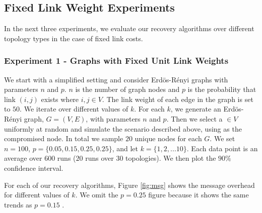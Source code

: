 \subsection{Fixed Link Weight Experiments}
\label{subsec:fixed}

In the next three experiments, we evaluate our recovery algorithms over different topology types in the case of fixed link costs.

\subsubsection{Experiment 1 - \er Graphs with Fixed Unit Link Weights}
\label{subsubsec:expt1}

We start with a simplified setting and consider 
Erd\"{o}s-R\'enyi graphs with parameters $n$ and $p$. 
$n$ is the number of graph nodes and $p$ is the probability that link $(i,j)$ exists where $i,j \in V$.
The link weight of each edge in the graph is set to $50$.
We iterate over different values of $k$. For each $k$, we 
generate an Erd\"{o}s-R\'enyi graph, $G = (V,E)$, with parameters $n$ and $p$. Then we select a \bad $\in V$ uniformly at random and simulate the scenario described above, 
using \bad as the compromised node. In total we sample $20$ unique nodes for each $G$.
We set $n=100$, $p=\{0.05,0.15,0.25, 0.25\}$, and let $k=\{1,2,
... 10\}$. Each data point is an average over $600$ runs ($20$ runs over 
$30$ topologies).  We then plot the $90 \%$ confidence interval.

For each of our recovery algorithms, Figure \ref{fig:msg} shows the
message overhead for different values of $k$. %
We omit the $p=0.25$ figure because it shows the same trends as $p=0.15$ \cite{Tech}. 

\begin{figure*}[t]
\centering
{}
\caption{Message overhead for \er Graphs with Fixed Unit Link Weights generated over different $p$ values. Note that the y-axis have different scales.}
\label{fig:msg}
\end{figure*}

